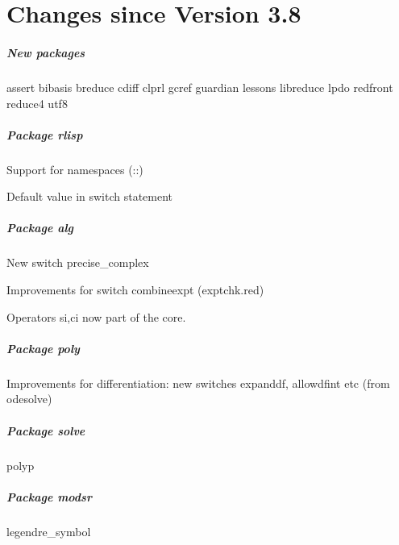 \chapter{Changes since Version 3.8}

\paragraph*{New packages}

assert
bibasis
breduce
cdiff
clprl
gcref
guardian
lessons
libreduce
lpdo
redfront
reduce4
utf8

\paragraph*{Package rlisp}

Support for namespaces (::)

Default value in switch statement


\paragraph*{Package alg}

New switch precise\_complex

Improvements for switch combineexpt (exptchk.red)

Operators si,ci now part of the core.

\paragraph*{Package poly}

Improvements for differentiation: new switches expanddf, allowdfint etc (from odesolve)

\paragraph*{Package solve}

polyp

\paragraph*{Package modsr}

legendre\_symbol
